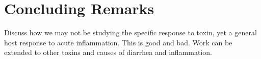 \chapter{Concluding Remarks}

Discuss how we may not be studying the specific response to toxin,
yet a general host response to acute inflammation. This is good and 
bad. Work can be extended to other toxins and causes of
diarrhea and inflammation.